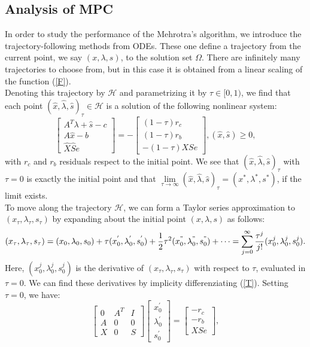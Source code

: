 \documentclass[a4paper,10 pt,titlepage,twoside]{book}
\theoremstyle{plain}
\theoremstyle{definition}
\theoremstyle{remark}
\begin{document}
\subsection*{Analysis of MPC}
In order to study the performance of the Mehrotra's algorithm, we introduce the trajectory-following methods from ODEs. These one define a trajectory from the current point, we say $(x,\lambda,s)$, to the solution set $\Omega$. There are infinitely many trajectories to choose from, but in this case it is obtained from a linear scaling of the function (\ref{F}).\\ Denoting this trajectory by $\mathcal{H}$ and parametrizing it by $\tau\in[0,1)$, we find that each point $(\hat{x},\hat{\lambda},\hat{s})_{\tau}\in\mathcal{H}$ is a solution of the following nonlinear system:
\begin{equation}\label{T}
\begin{bmatrix}
A^{T}\lambda+\hat{s}-c \\A\hat{x}-b \\\hat{X}\hat{S}e
\end{bmatrix}=-\begin{bmatrix}
(1-\tau)r_{c}\\(1-\tau)r_{b}\\-(1-\tau)XSe
\end{bmatrix}, (\hat{x},\hat{s})\geq0,
\end{equation}
with $r_{c}$ and $r_{b}$ residuals respect to the initial point. We see that $(\hat{x},\hat{\lambda},\hat{s})_{\tau}$ with $\tau = 0$ is exactly the initial point and that $\lim\limits_{\tau\to\infty}(\hat{x},\hat{\lambda},\hat{s})_{\tau} = (x^{*},\lambda^{*},s^{*})$, if the limit exists.\\
To move along the trajectory $\mathcal{H}$, we can form a Taylor series approximation to $(x_{\tau},\lambda_{\tau},s_{\tau})$ by expanding about the initial point  $(x,\lambda,s)$ as follows:
\begin{equation*}
(x_{\tau},\lambda_{\tau},s_{\tau})=(x_{0},\lambda_{0},s_{0})+\tau(x_{0}^{'},\lambda_{0}^{'},s_{0}^{'})+\frac{1}{2}\tau^{2}(x_{0}^{"},\lambda_{0}^{"},s_{0}^{"})+\dots = \sum_{j=0}^{\infty}\frac{\tau^{j}}{j!}(x_{0}^{j},\lambda_{0}^{j},s_{0}^{j}).
\end{equation*}
Here, $(x_{0}^{j},\lambda_{0}^{j},s_{0}^{j})$ is the derivative of $(x_{\tau},\lambda_{\tau},s_{\tau})$ with respect to $\tau$, evaluated in $\tau = 0$. We can find these derivatives by implicity differenziating (\ref{T}). Setting $\tau=0$, we have:
\begin{equation*}
\begin{bmatrix}
0&A^{T}&I \\A&0&0\\X&0&S
\end{bmatrix}\begin{bmatrix}
x_{0}^{'}\\\lambda_{0}^{'}\\s_{0}^{'}
\end{bmatrix}=\begin{bmatrix}
-r_{c}\\-r_{b}\\XSe
\end{bmatrix},
\end{equation*}
\end{document}
